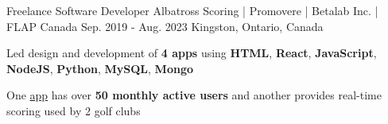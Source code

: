 \begin{cventries}
  \cventry
    {Freelance Software Developer} %
    {Albatross Scoring | Promovere | Betalab Inc. | FLAP Canada} %
    {Sep. 2019 - Aug. 2023} %
    {Kingston, Ontario, Canada} %
    {
      \begin{cvitems} %
        \item{Led design and development of \textbf{4 apps} using \textbf{HTML}, \textbf{React}, \textbf{JavaScript}, \textbf{NodeJS}, \textbf{Python}, \textbf{MySQL}, \textbf{Mongo}}
        \item{One \href{https://www.flapapp.ca/}{app} has over \textbf{50 monthly active users} and another provides real-time scoring used by 2 golf clubs}

\end{cvitems}}
\end{cventries}
